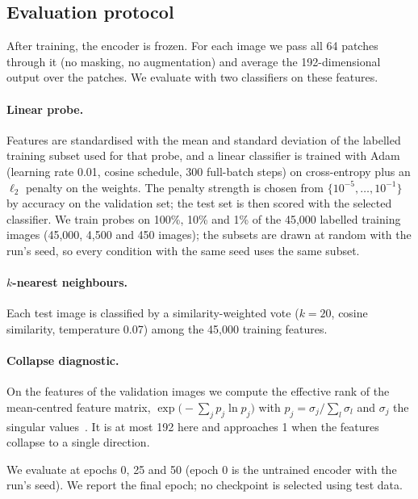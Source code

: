 \documentclass[pdflatex,sn-basic]{sn-jnl}%
\begin{document}
\subsection{Evaluation protocol}\label{sec:eval}
After training, the encoder is frozen. For each image we pass all 64 patches through it (no masking, no augmentation) and average the 192-dimensional output over the patches. We evaluate with two classifiers on these features.

\paragraph{Linear probe.} Features are standardised with the mean and standard deviation of the labelled training subset used for that probe, and a linear classifier is trained with Adam (learning rate 0.01, cosine schedule, 300 full-batch steps) on cross-entropy plus an $\ell_2$ penalty on the weights. The penalty strength is chosen from $\{10^{-5},\dots,10^{-1}\}$ by accuracy on the validation set; the test set is then scored with the selected classifier. We train probes on 100\%, 10\% and 1\% of the 45,000 labelled training images (45,000, 4,500 and 450 images); the subsets are drawn at random with the run's seed, so every condition with the same seed uses the same subset.

\paragraph{$k$-nearest neighbours.} Each test image is classified by a similarity-weighted vote ($k=20$, cosine similarity, temperature 0.07) among the 45,000 training features.

\paragraph{Collapse diagnostic.} On the features of the validation images we compute the effective rank of the mean-centred feature matrix, $\exp\!\big(-\sum_j p_j\ln p_j\big)$ with $p_j=\sigma_j/\sum_l\sigma_l$ and $\sigma_j$ the singular values~\cite{garrido2023rankme}. It is at most 192 here and approaches 1 when the features collapse to a single direction.

We evaluate at epochs 0, 25 and 50 (epoch 0 is the untrained encoder with the run's seed). We report the final epoch; no checkpoint is selected using test data.
\end{document}
